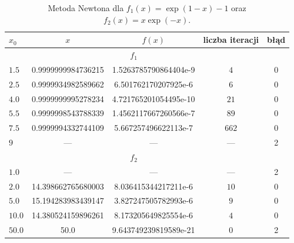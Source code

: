 \documentclass{classrep}
\begin{document}
		\begin{table}[!hpbt]
        		\centering
        		\footnotesize
			\begin{tabular}{lSScc} \toprule
				{$x_0$} & {$x$} & {$f(x)$} & {liczba iteracji} & {błąd} \\ \midrule
				 \\ \hline
				$1.5$ & 0.9999999984736215 & 1.5263785790864404e-9 & $4$ & 0\\ 
				$2.5$ & 0.9999934982589662 & 6.501762170207925e-6 & $6$ & 0\\
				$4.0$ & 0.9999999995278234 & 4.721765201054495e-10 & $21$ & 0\\
	 			$5.5$ & 0.9999998543788339 & 1.4562117667260566e-7 & $89$ & 0\\
	 			$7.5$ & 0.9999994332744109 & 5.667257496622113e-7 & $662$ & 0\\
	 			$9$ & {---} & {---} & {---} & 2\\ \hline
	 			 \\ \hline
	 			$1.0$ & {---} & {---} & {---} & 2 \\ 
	 			$2.0$ & 14.398662765680003 & 8.036415344217211e-6 & $10$ & 0\\ 
	 			$5.0$ & 15.194283983439147 & 3.827247505782993e-6 & $9$ & 0\\
	 			$10.0$ & 14.380524159896261 & 8.173205649825554e-6 & $4$ & 0\\ 
	 			$50.0$ & 50.0 & 9.643749239819589e-21 & $0$ & 2\\ \bottomrule
	 		\end{tabular}
	 		\caption{Metoda Newtona dla $f_1(x)=\exp(1-x)-1$ oraz $f_2(x)=x\exp(-x)$.}
			\label{table:5}			
		\end{table}	
\end{document}
